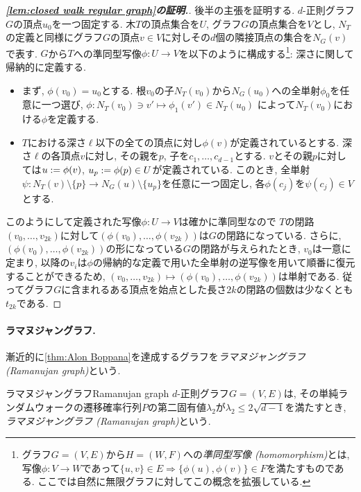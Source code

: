 \begin{proof}[\textbf{\cref{lem:closed walk regular graph}の証明.}]
    後半の主張を証明する.
    $d$-正則グラフ$G$の頂点$u_0$を一つ固定する.
    木$T$の頂点集合を$U$, グラフ$G$の頂点集合を$V$とし,
    $N_T$の定義と同様にグラフ$G$の頂点$v \in V$に対しその$d$個の隣接頂点の集合を$N_G(v)$で表す.
    $G$から$T$への準同型写像$\phi \colon U \to V$を以下のように構成する\footnote{グラフ$G=(V,E)$から$H=(W,F)$への\emph{準同型写像 (homomorphism)}とは, 写像$\phi\colon V\to W$であって$\{u,v\}\in E\Rightarrow \{\phi(u),\phi(v)\}\in F$を満たすものである. ここでは自然に無限グラフに対してこの概念を拡張している.}:
    深さに関して帰納的に定義する.
    \begin{itemize}
        \item まず, $\phi(v_0) = u_0$とする.
              根$v_0$の子$N_T(v_0)$から$N_G(u_0)$への全単射$\phi_0$を任意に一つ選び,
              $\phi\colon N_T(v_0) \ni v' \mapsto \phi_1(v') \in N_T(u_0)$
              によって$N_T(v_0)$における$\phi$を定義する.
        \item $T$における深さ$\ell$以下の全ての頂点に対し$\phi(v)$が定義されているとする. 深さ$\ell$の各頂点$v$に対し, その親を$p$, 子を$c_1,\dots,c_{d-1}$とする. $v$とその親$p$に対しては$u\mathrel{:=} \phi(v)$, $u_p\mathrel{:=} \phi(p)\in U$が定義されている. このとき, 全単射$\psi\colon N_T(v)\setminus \{p\} \to N_G(u)\setminus\{u_p\}$を任意に一つ固定し, 各$\phi(c_j)$を$\psi(c_j)\in V$とする.
    \end{itemize}
    このようにして定義された写像$\phi\colon U \to V$は確かに準同型なので
    $T$の閉路$(v_0,\dots,v_{2k})$に対して$(\phi(v_0),\dots,\phi(v_{2k}))$は$G$の閉路になっている.
    さらに, $(\phi(v_0),\dots,\phi(v_{2k}))$の形になっている$G$の閉路が与えられたとき, $v_0$は一意に定まり, 以降の$v_i$は$\phi$の帰納的な定義で用いた全単射の逆写像を用いて順番に復元することができるため, $(v_0,\dots,v_{2k}) \mapsto (\phi(v_0),\dots,\phi(v_{2k}))$は単射である.
    従ってグラフ$G$に含まれるある頂点を始点とした長さ$2k$の閉路の個数は少なくとも$t_{2k}$である.
\end{proof}


\paragraph*{ラマヌジャングラフ.}
漸近的に\cref{thm:Alon Boppana}を達成するグラフを\emph{ラマヌジャングラフ (Ramanujan graph)}という.
\begin{definition}{ラマヌジャングラフ}{Ramanujan graph}
    $d$-正則グラフ$G=(V,E)$は, その単純ランダムウォークの遷移確率行列$P$の第二固有値$\lambda_2$が$\lambda_2 \le 2\sqrt{d-1}$を満たすとき, \emph{ラマヌジャングラフ (Ramanujan graph)}という.
\end{definition}

